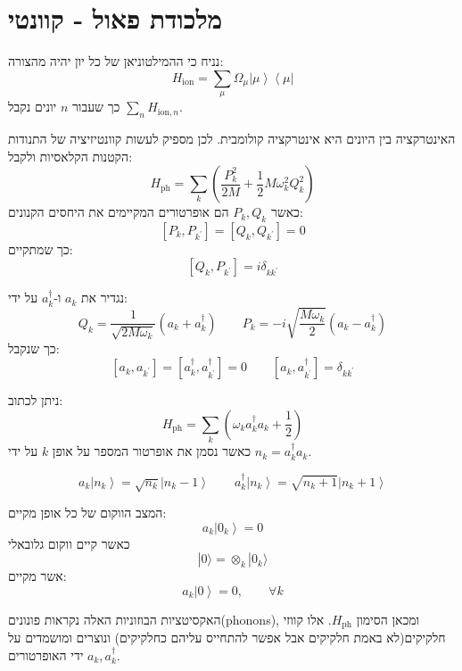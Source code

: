 \documentclass{tstextbook}
\begin{document}
\section{מלכודת פאול - קוונטי}

\begin{proposition}
נניח כי ההמילטוניאן של כל יון יהיה מהצורה:
$$H_{\mathrm{ion}}=\sum_{\mu}\Omega_{\mu}\left|\mu\right\rangle\left\langle\mu\right|$$
כך שעבור \(n\) יונים נקבל \(\sum_{n}H_{\text{ion},n}\).

\end{proposition}
\begin{proposition}
האינטרקציה בין היונים היא אינטרקציה קולומבית. לכן מספיק לעשות קוונטיזיציה של התנודות הקטנות הקלאסיות ולקבל:
$$H_{\mathrm{ph}}=\sum_{k}\left(\frac{P_{k}^{2}}{2M}+\frac{1}{2}M\omega_{k}^{2}Q_{k}^{2}\right)$$
כאשר \(P_{k},Q_{k}\) הם אופרטורים המקיימים את היחסים הקנונים:
$$[P_{k},P_{k^{\prime}}]=[Q_{k},Q_{k^{\prime}}]=0$$
כך שמתקיים:
$$\left[Q_{k},P_{k^{\prime}}\right]=i\delta_{k k^{\prime}}$$

\end{proposition}
\begin{definition}
נגדיר את \(a_{k}\) ו-\(a_{k}^{\dagger}\) על ידי:
$$Q_{k}=\frac{1}{\sqrt{2M\omega_{k}}}\left(a_{k}+a_{k}^{\dagger}\right)\qquad P_{k}=-i\sqrt{\frac{M\omega_{k}}{2}}\left(a_{k}-a_{k}^{\dagger}\right)$$
כך שנקבל:
$$\left[a_{k},a_{k^{\prime}}\right]=\left[a_{k}^{\dagger},a_{k^{\prime}}^{\dagger}\right]=0\qquad \left[a_{k},a_{k^{\prime}}^{\dagger}\right]=\delta_{k k^{\prime}}$$

\end{definition}
\begin{corollary}
ניתן לכתוב:
$$H_{\mathrm{ph}}=\sum_{k}\left(\omega_{k}a_{k}^{\dagger}a_{k}+\frac{1}{2}\right)$$
כאשר נסמן את אופרטור המספר על אופן \(k\) על ידי \(n_{k}=a_{k}^{\dagger}a_{k}\). 

\end{corollary}
\begin{proposition}
$$a_{k}\left|n_{k}\right\rangle=\sqrt{n_{k}}\left|n_{k}-1\right\rangle \qquad a_{k}^{\dagger}\left|n_{k}\right\rangle=\sqrt{n_{k}+1}\left|n_{k}+1\right\rangle$$

\end{proposition}
\begin{proposition}
המצב הווקום של כל אופן מקיים:
$$a_{k}\left|0_{k}\right\rangle=0$$
כאשר קיים ווקום גלובאלי $$|0\rangle=\otimes_{k}|0_{k}\rangle$$
אשר מקיים:
$$a_{k}\left|0\right\rangle=0,\qquad\forall k$$

\end{proposition}
\begin{remark}
האקסיטציות הבוזוניות האלה נקראות פונונים(phonons), ומכאן הסימון \(H_{\text{ph}}\). אלו קווזי חלקיקים(לא באמת חלקיקים אבל אפשר להתחייס עליהם כחלקיקים) ונוצרים ומושמדים על ידי האופרטורים \(a_{k},a_{k}^{\dagger}\).

\end{remark}
\end{document}
